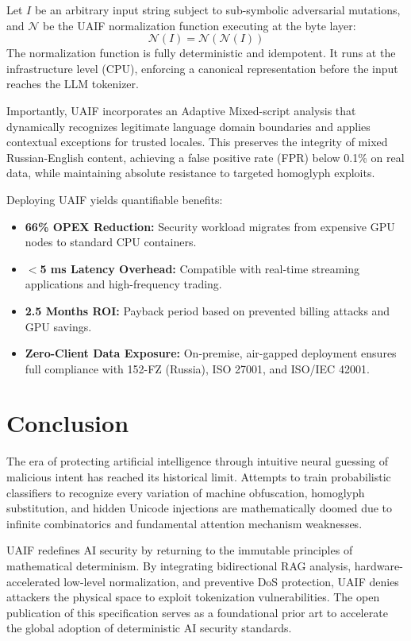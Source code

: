 \documentclass[10pt,a4paper]{article}
\begin{document}
Let $I$ be an arbitrary input string subject to sub-symbolic adversarial mutations, and $\mathcal{N}$ be the UAIF normalization function executing at the byte layer:
\begin{equation}
\mathcal{N}(I) = \mathcal{N}(\mathcal{N}(I))
\end{equation}
The normalization function is fully deterministic and idempotent. It runs at the infrastructure level (CPU), enforcing a canonical representation before the input reaches the LLM tokenizer.

Importantly, UAIF incorporates an Adaptive Mixed-script analysis that dynamically recognizes legitimate language domain boundaries and applies contextual exceptions for trusted locales. This preserves the integrity of mixed Russian-English content, achieving a false positive rate (FPR) below 0.1\% on real data, while maintaining absolute resistance to targeted homoglyph exploits.

Deploying UAIF yields quantifiable benefits:
\begin{itemize}
    \item \textbf{66\% OPEX Reduction:} Security workload migrates from expensive GPU nodes to standard CPU containers.
    \item \textbf{$<$5 ms Latency Overhead:} Compatible with real-time streaming applications and high-frequency trading.
    \item \textbf{2.5 Months ROI:} Payback period based on prevented billing attacks and GPU savings.
    \item \textbf{Zero-Client Data Exposure:} On-premise, air-gapped deployment ensures full compliance with 152-FZ (Russia), ISO 27001, and ISO/IEC 42001.
\end{itemize}

\section{Conclusion}
The era of protecting artificial intelligence through intuitive neural guessing of malicious intent has reached its historical limit. Attempts to train probabilistic classifiers to recognize every variation of machine obfuscation, homoglyph substitution, and hidden Unicode injections are mathematically doomed due to infinite combinatorics and fundamental attention mechanism weaknesses.

UAIF redefines AI security by returning to the immutable principles of mathematical determinism. By integrating bidirectional RAG analysis, hardware-accelerated low-level normalization, and preventive DoS protection, UAIF denies attackers the physical space to exploit tokenization vulnerabilities. The open publication of this specification serves as a foundational prior art to accelerate the global adoption of deterministic AI security standards.
\end{document}
